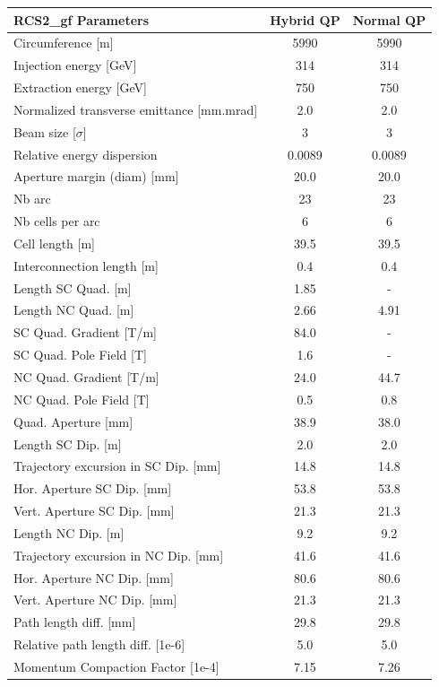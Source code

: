 \begin{tabular}{lcc}
\toprule
RCS2_gf Parameters & Hybrid QP & Normal QP \\
\midrule
Circumference [m] & 5990 & 5990 \\
Injection energy [GeV] & 314 & 314 \\
Extraction energy [GeV] & 750 & 750 \\
Normalized transverse emittance [mm.mrad] & 2.0 & 2.0 \\
Beam size [$\sigma$] & 3 & 3 \\
Relative energy dispersion & 0.0089 & 0.0089 \\
Aperture margin (diam) [mm] & 20.0 & 20.0 \\
Nb arc & 23 & 23 \\
Nb cells per arc & 6 & 6 \\
Cell length [m] & 39.5 & 39.5 \\
Interconnection length [m] & 0.4 & 0.4 \\
Length SC Quad. [m] & 1.85 & - \\
Length NC Quad. [m] & 2.66 & 4.91 \\
SC Quad. Gradient [T/m] & 84.0 & - \\
SC Quad. Pole Field [T] & 1.6 & - \\
NC Quad. Gradient [T/m] & 24.0 & 44.7 \\
NC Quad. Pole Field [T] & 0.5 & 0.8 \\
Quad. Aperture [mm] & 38.9 & 38.0 \\
Length SC Dip. [m] & 2.0 & 2.0 \\
Trajectory excursion in SC Dip. [mm] & 14.8 & 14.8 \\
Hor. Aperture SC Dip. [mm] & 53.8 & 53.8 \\
Vert. Aperture SC Dip. [mm] & 21.3 & 21.3 \\
Length NC Dip. [m] & 9.2 & 9.2 \\
Trajectory excursion in NC Dip. [mm] & 41.6 & 41.6 \\
Hor. Aperture NC Dip. [mm] & 80.6 & 80.6 \\
Vert. Aperture NC Dip. [mm] & 21.3 & 21.3 \\
Path length diff. [mm] & 29.8 & 29.8 \\
Relative path length diff. [1e-6] & 5.0 & 5.0 \\
Momentum Compaction Factor [1e-4] & 7.15 & 7.26 \\
\bottomrule
\end{tabular}
